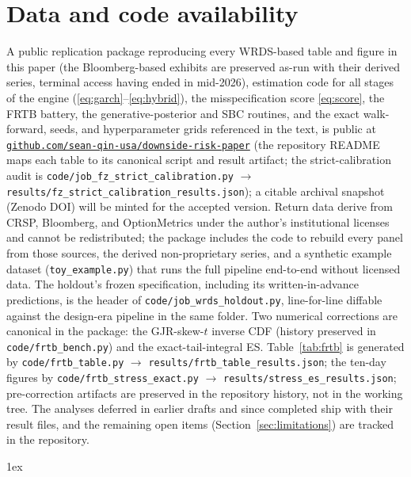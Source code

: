 \documentclass[11pt]{article}
\theoremstyle{remark}
\begin{document}
\section*{Data and code availability}
A public replication package reproducing every WRDS-based table and
figure in this paper (the Bloomberg-based exhibits are preserved
as-run with their derived series, terminal access having ended in
mid-2026), estimation code for all stages of the engine
(\eqref{eq:garch}--\eqref{eq:hybrid}), the misspecification score
\eqref{eq:score}, the FRTB battery, the generative-posterior and SBC
routines, and the exact walk-forward, seeds, and hyperparameter grids referenced in the text, is public at
\href{https://github.com/sean-qin-usa/downside-risk-paper}{\texttt{github.com/sean-qin-usa/downside-risk-paper}}
(the repository README maps each table to its canonical script and
result artifact; the strict-calibration audit is
\texttt{code/job\_fz\_strict\_calibration.py}
$\to$ \texttt{results/fz\_strict\_calibration\_results.json});
a citable archival snapshot (Zenodo DOI) will be minted for the
accepted version. Return data derive from CRSP,
Bloomberg, and OptionMetrics under the author's institutional licenses
and cannot be redistributed; the package includes the code to rebuild
every panel from those sources, the derived non-proprietary series, and
a synthetic example dataset (\texttt{toy\_example.py}) that runs the full
pipeline end-to-end without licensed data. The holdout's frozen
specification, including its written-in-advance predictions, is the
header of \texttt{code/job\_wrds\_holdout.py}, line-for-line diffable
against the design-era pipeline in the same folder. Two numerical corrections are canonical in the package:
the GJR-skew-$t$ inverse CDF (history preserved in
\texttt{code/frtb\_bench.py}) and the exact-tail-integral ES.
Table~\ref{tab:frtb} is generated by \texttt{code/frtb\_table.py}
$\to$ \texttt{results/frtb\_table\_results.json}; the ten-day
figures by \texttt{code/frtb\_stress\_exact.py} $\to$
\texttt{results/stress\_es\_results.json}; pre-correction artifacts
are preserved in the repository history, not in the working tree. The
analyses deferred in earlier drafts and since completed ship with
their result files, and the remaining open items
(Section~\ref{sec:limitations}) are tracked in the repository.

\begingroup
\parindent 0pt\parskip 1ex
\renewcommand{\enotesize}{\normalsize}
\theendnotes
\endgroup




\end{document}
